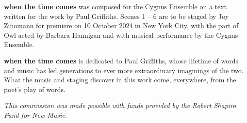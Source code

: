 \textbf{when the time comes} was composed for the Cygnus Ensemble on a text
written for the work by Paul Griffiths. Scenes 1 -- 6 are to be staged by Joy
Zinomann for premiere on 10 October 2024 in New York City, with the part of Owl
acted by Barbara Hannigan and with musical performance by the Cygnus Ensemble.

\textbf{when the time comes} is dedicated to Paul Griffiths, whose lifetime of
words and music has led generations to ever more extraordinary imaginings of
the two. What the music and staging discover in this work come, everywhere,
from the poet's play of words.

\begin{center}
\textit{This commission was made possible with funds provided by the Robert
Shapiro Fund for New Music.}
\end{center}
